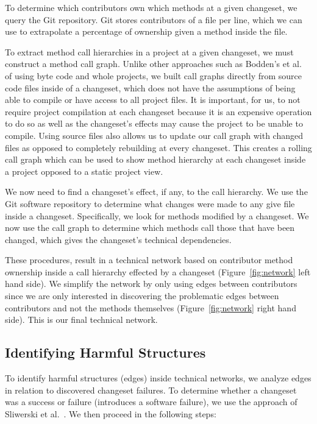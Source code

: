 \documentclass[conference]{IEEEtran}
\begin{document}
To determine which contributors own which methods at a given changeset, we query
the Git repository. Git stores contributors of a file per line, which we can use to extrapolate
a percentage of ownership given a method inside the file.

To extract method call hierarchies in a project at a given changeset, we must construct
a method call graph. Unlike other approaches such as Bodden's et al.~\cite{Bodden:2003:HVJ} 
of using byte code and whole projects, we built call graphs directly from source code files
inside of a changeset, 
which does not have the assumptions of being able to compile or have access to all project 
files. It is important, for us, to not require project compilation at each changeset because it is
an expensive operation to do so as well as the changeset's effects may cause the project
to be unable to compile. Using source files also allows us to update our call graph
with changed files as opposed to completely rebuilding at 
every changeset. This creates a rolling call graph which 
can be used to show method hierarchy at each changeset inside a project opposed to
a static project view.

We now need to find a changeset's effect, if any, to the call hierarchy. We use the Git
software repository to determine what changes were made to any give file inside a 
changeset. Specifically, we look for methods modified by a changeset. We now use
the call graph to determine which methods call those that have been changed, which
gives the changeset's technical dependencies.

These procedures, result in a technical network based on contributor method ownership 
inside a call hierarchy effected by a changeset (Figure~\ref{fig:network} left hand side).
We simplify the network by only using edges between contributors since we 
are only interested in discovering the problematic edges between contributors and not the 
methods themselves (Figure~\ref{fig:network} right hand side). This is our final technical 
network.

\subsection{Identifying Harmful Structures}
To identify harmful structures (edges) inside technical networks, we analyze 
edges in relation to discovered changeset failures. To determine whether a changeset 
was a success or failure (introduces a software failure), we use the approach of
Sliwerski et al.~\cite{Sliwerski:2005:CIF}. We then proceed in the following steps:
\end{document}
